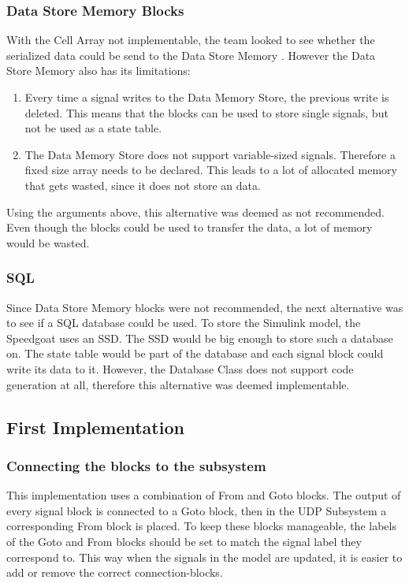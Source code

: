 \subsubsection{Data Store Memory Blocks}
With the Cell Array not implementable, the team looked to see whether the serialized data could be send to the Data Store Memory \cite{web:datastore}. However the Data Store Memory also has its limitations:
\begin{enumerate}
	\item Every time a signal writes to the Data Memory Store, the previous write is deleted. This means that the blocks can be used to store single signals, but not be used as a state table.
	\item The Data Memory Store does not support variable-sized signals. Therefore a fixed size array needs to be declared. This leads to a lot of allocated memory that gets wasted, since it does not store an data.
\end{enumerate}
Using the arguments above, this alternative was deemed as not recommended. Even though the blocks could be used to transfer the data, a lot of memory would be wasted.

\subsubsection{SQL}
Since Data Store Memory blocks were not recommended, the next alternative was to see if a SQL database could be used. To store the Simulink model, the Speedgoat uses an SSD. The SSD would be big enough to store such a database on. The state table would be part of the database and each signal block could write its data to it. However, the Database Class does not support code generation at all, therefore this alternative was deemed implementable.

\subsection{First Implementation}\label{sec:simfirim}
\subsubsection{Connecting the blocks to the subsystem}
This implementation uses a combination of From \cite{web:from} and Goto \cite{web:goto} blocks. The output of every signal block is connected to a Goto block, then in the UDP Subsystem a corresponding From block is placed. To keep these blocks manageable, the labels of the Goto and From blocks should be set to match the signal label they correspond to. This way when the signals in the model are updated, it is easier to add or remove the correct connection-blocks.

